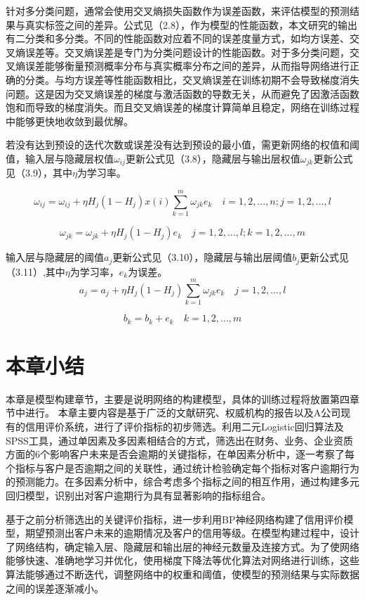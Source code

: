 针对多分类问题，通常会使用交叉熵损失函数作为误差函数，来评估模型的预测结果与真实标签之间的差异。公式见（2.8），作为模型的性能函数，本文研究的输出有二分类和多分类。不同的性能函数对应着不同的误差度量方式，如均方误差、交叉熵误差等。交叉熵误差是专门为分类问题设计的性能函数。对于多分类问题，交叉熵误差能够衡量预测概率分布与真实概率分布之间的差异，从而指导网络进行正确的分类。与均方误差等性能函数相比，交叉熵误差在训练初期不会导致梯度消失问题。这是因为交叉熵误差的梯度与激活函数的导数无关，从而避免了因激活函数饱和而导致的梯度消失。而且交叉熵误差的梯度计算简单且稳定，网络在训练过程中能够更快地收敛到最优解。


若没有达到预设的迭代次数或误差没有达到预设的最小值，需更新网络的权值和阈值，输入层与隐藏层权值$\omega_{ij} $更新公式见（3.8），隐藏层与输出层权值$\omega_{jk} $更新公式见（3.9），其中$\eta$为学习率。

\begin{equation}
	\omega_{ij} = \omega_{ij} + \eta H_j(1 - H_j)x(i) \sum\limits_{k=1}^{m}\omega_{jk}e_k  \quad i =1,2,...,n;j =1,2,...,l
\end{equation}

\begin{equation}
	\omega_{jk} = \omega_{jk} + \eta H_j(1 - H_j)e_k  \quad j =1,2,...,l; k =1,2,...,m
\end{equation}

输入层与隐藏层的阈值$a_j$更新公式见（3.10），隐藏层与输出层阈值$b_j$更新公式见（3.11）,其中$\eta$为学习率，$e_k$为误差。
\begin{equation}
	a_j = a_j + \eta H_j(1 - H_j)\sum\limits_{k=1}^{m}\omega_{jk}e_k  \quad j =1,2,...,l
\end{equation}

\begin{equation}
	b_k = b_k + e_k  \quad k =1,2,...,m
\end{equation}


 \section{本章小结}
 本章是模型构建章节，主要是说明网络的构建模型，具体的训练过程将放置第四章节中进行。
本章主要内容是基于广泛的文献研究、权威机构的报告以及A公司现有的信用评价系统，进行了评价指标的初步筛选。利用二元Logistic回归算法及SPSS工具，通过单因素及多因素相结合的方式，筛选出在财务、业务、企业资质方面的6个影响客户未来是否会逾期的关键指标，在单因素分析中，逐一考察了每个指标与客户是否逾期之间的关联性，通过统计检验确定每个指标对客户逾期行为的预测能力。在多因素分析中，综合考虑多个指标之间的相互作用，通过构建多元回归模型，识别出对客户逾期行为具有显著影响的指标组合。

基于之前分析筛选出的关键评价指标，进一步利用BP神经网络构建了信用评价模型，期望预测出客户未来的逾期情况及客户的信用等级。在模型构建过程中，设计了网络结构，确定输入层、隐藏层和输出层的神经元数量及连接方式。为了使网络能够快速、准确地学习并优化，使用梯度下降法等优化算法对网络进行训练，这些算法能够通过不断迭代，调整网络中的权重和阈值，使模型的预测结果与实际数据之间的误差逐渐减小。